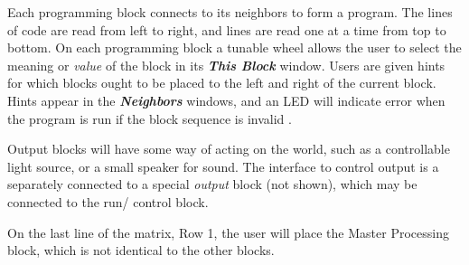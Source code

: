 Each programming block connects to its neighbors to form a program. The lines of  code are read from left to right, and lines are read one at a time from top to bottom. On each programming block a tunable wheel allows the user to select the meaning or \textit{value} of the block  in its \textbf{\textit{This Block}} window.  Users are given hints for which blocks ought to be placed to the left and right of the current block. Hints appear in the \textbf{\textit{Neighbors}} windows, and an LED will indicate error when the program is run if the block sequence is invalid . 

Output blocks will have some way of acting on the world, such as a controllable light source, or a small speaker for sound. The interface to control  output is a separately connected to a special \textit{output} block (not shown), which may be connected to the run/ control block.


   
    On the last line of the matrix, Row 1, the user will place the Master Processing block, which is not identical to the other blocks.
